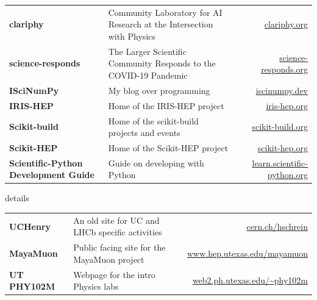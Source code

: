 \documentclass[10pt,letterpaper]{moderncv}
\begin{document}

\begin{tabularx}{\textwidth}{>{\bfseries}p{1.45in}>{\raggedright\arraybackslash}Xr}
clariphy & Community Laboratory for AI Research at the Intersection with Physics & \url{clariphy.org} \\
science-responds & The Larger Scientific Community Responds to the COVID-19 Pandemic & \url{science-responds.org} \\
ISciNumPy & My blog over programming & \url{iscinumpy.dev} \\
IRIS-HEP & Home of the IRIS-HEP project & \url{iris-hep.org} \\
Scikit-build & Home of the scikit-build projects and events & \url{scikit-build.org} \\
Scikit-HEP & Home of the Scikit-HEP project & \url{scikit-hep.org} \\
Scientific-Python Development Guide & Guide on developing with Python & \url{learn.scientific-python.org} \\
\end{tabularx}

\begin{taggedblock}{details}
\begin{tabularx}{\textwidth}{>{\bfseries}p{1.45in}>{\raggedright\arraybackslash}Xr}
UCHenry & An old site for UC and LHCb specific activities & \url{cern.ch/hschrein}  \\
MayaMuon & Public facing site for the MayaMuon project & \url{www.hep.utexas.edu/mayamuon} \\
UT PHY102M & Webpage for the intro Physics labs & \url{web2.ph.utexas.edu/~phy102m}  \\
\end{tabularx}
\end{taggedblock}


\end{document}
